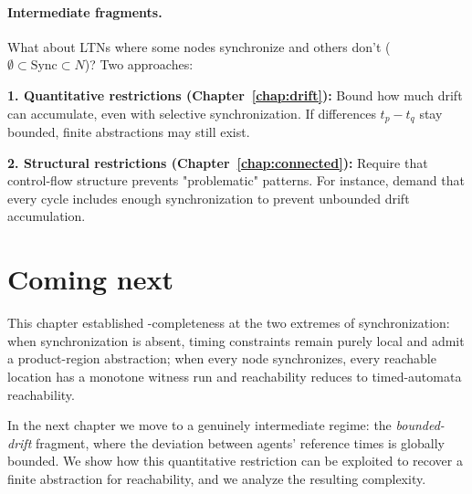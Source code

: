 \paragraph{Intermediate fragments.} What about LTNs where some nodes synchronize and others don't ($\emptyset \subset \text{Sync} \subset N$)? Two approaches:

\textbf{1. Quantitative restrictions (Chapter~\ref{chap:drift}):} Bound how much drift can accumulate, even with selective synchronization. If differences $t_p - t_q$ stay bounded, finite abstractions may still exist.

\textbf{2. Structural restrictions (Chapter~\ref{chap:connected}):} Require that control-flow structure prevents "problematic" patterns. For instance, demand that every cycle includes enough synchronization to prevent unbounded drift accumulation.


\section{Coming next}
\label{sec:fragments-coming-next}

This chapter established \PSPACE-completeness at the two extremes of
synchronization: when synchronization is absent, timing constraints remain
purely local and admit a product-region abstraction; when every node
synchronizes, every reachable location has a monotone witness run and
reachability reduces to timed-automata reachability.

\smallskip
In the next chapter we move to a genuinely intermediate regime: the
\emph{bounded-drift} fragment, where the deviation between agents' reference
times is globally bounded. We show how this quantitative restriction can be
exploited to recover a finite abstraction for reachability, and we analyze the
resulting complexity.


